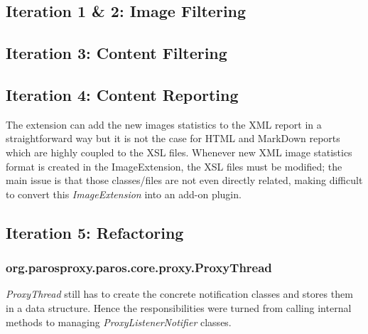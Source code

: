 \subsection{Iteration 1 \& 2: Image Filtering}
\subsection{Iteration 3: Content Filtering}
\subsection{Iteration 4: Content Reporting}
The extension can add the new images statistics to the XML report in a straightforward way but it is not the case for HTML and MarkDown reports which are highly coupled to the XSL files. Whenever new XML image statistics format is created in the ImageExtension, the XSL files must be modified; the main issue is that those classes/files are not even directly related, making difficult to convert this \textit{ImageExtension} into an add-on plugin.

\subsection{Iteration 5: Refactoring}
\subsubsection{org.parosproxy.paros.core.proxy.ProxyThread}

\textit{ProxyThread} still has to create the concrete notification classes and stores them in a data structure. Hence the responsibilities were turned from calling internal methods to managing \textit{ProxyListenerNotifier} classes.